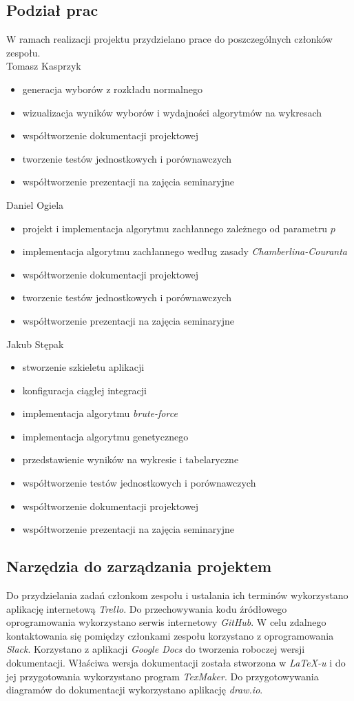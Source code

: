 \documentclass[polish,11pt]{aghthesis}
\begin{document}
\subsection{Podział prac}
W ramach realizacji projektu przydzielano prace do poszczególnych członków zespołu.
\vspace{\baselineskip} \\
Tomasz Kasprzyk
\begin{itemize}
\item generacja wyborów z rozkładu normalnego
\item wizualizacja wyników wyborów i wydajności algorytmów na wykresach
\item współtworzenie dokumentacji projektowej
\item tworzenie testów jednostkowych i porównawczych
\item współtworzenie prezentacji na zajęcia seminaryjne
\end{itemize}
Daniel Ogiela
\begin{itemize}
\item projekt i implementacja algorytmu zachłannego zależnego od parametru $p$
\item implementacja algorytmu zachłannego według zasady \textit{Chamberlina-Couranta}
\item współtworzenie dokumentacji projektowej
\item tworzenie testów jednostkowych i porównawczych
\item współtworzenie prezentacji na zajęcia seminaryjne 
\end{itemize}
Jakub Stępak
\begin{itemize}
\item stworzenie szkieletu aplikacji
\item konfiguracja ciągłej integracji
\item implementacja algorytmu \textit{brute-force}
\item implementacja algorytmu genetycznego
\item przedstawienie wyników na wykresie i tabelaryczne
\item współtworzenie testów jednostkowych i porównawczych
\item współtworzenie dokumentacji projektowej
\item współtworzenie prezentacji na zajęcia seminaryjne
\end{itemize}

\subsection{Narzędzia do zarządzania projektem}
Do przydzielania zadań członkom zespołu i ustalania ich terminów wykorzystano aplikację
internetową \textit{Trello}. Do przechowywania kodu źródłowego oprogramowania wykorzystano
serwis internetowy \textit{GitHub}. W celu zdalnego kontaktowania się pomiędzy członkami zespołu korzystano z oprogramowania \textit{Slack}. Korzystano z aplikacji \textit{Google Docs }do tworzenia roboczej wersji dokumentacji. Właściwa wersja dokumentacji została stworzona w \textit{LaTeX-u} i do jej przygotowania wykorzystano program \textit{TexMaker}. Do przygotowywania diagramów do dokumentacji wykorzystano aplikację \textit{draw.io}.
\end{document}
